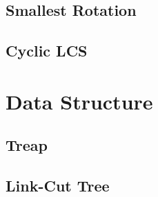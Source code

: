 \documentclass[a4paper,10pt,twocolumn,oneside]{article}
\begin{document}
\subsection{Smallest Rotation}


%

\subsection{Cyclic LCS}


\section{Data Structure}

% 

\subsection{Treap}


\subsection{Link-Cut Tree}


% 

%

%
\end{document}
